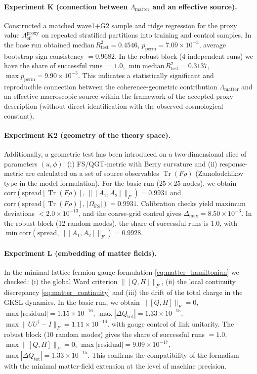 \documentclass[11pt,a4paper]{article}
\DeclareMathOperator{\Tr}{Tr}
\theoremstyle{definition}
\theoremstyle{plain}
\theoremstyle{remark}
\begin{document}
\paragraph{Experiment K (connection between $\Lambda_{\mathrm{matter}}$ and an effective source).}
Constructed a matched wave1+G2 sample and ridge regression for the proxy value
$\Lambda_{\mathrm{eff}}^{\mathrm{proxy}}$ on repeated stratified partitions into training and control samples.
In the base run obtained
$\mathrm{median}\,R^2_{\mathrm{test}}=0.4546$,
$p_{\mathrm{perm}}=7.09\times10^{-3}$,
average bootstrap sign consistency $=0.9682$.
In the robust block (4 independent runs) we have
the share of successful runs $=1.0$,
$\min\mathrm{median}\,R^2_{\mathrm{test}}=0.3137$,
$\max p_{\mathrm{perm}}=9.90\times10^{-3}$.
This indicates a statistically significant and reproducible connection between the
coherence-geometric contribution $\Lambda_{\mathrm{matter}}$ and an effective macroscopic source
within the framework of the accepted proxy description (without direct identification with the observed cosmological constant).

\paragraph{Experiment K2 (geometry of the theory space).}

Additionally, a geometric test has been introduced on a two-dimensional slice of parameters $(u,\phi)$:
(i) FS/QGT-metric with Berry curvature and (ii) response-metric are calculated on a set of source observables
$\Tr(F\rho)$ (Zamolodchikov type in the model formulation).
For the basic run ($25\times25$ nodes), we obtain
$\mathrm{corr}\!\left(\mathrm{spread}[\Tr(F\rho)],\,\|[A_1,A_2]\|_F\right)=0.9931$
and
$\mathrm{corr}\!\left(\mathrm{spread}[\Tr(F\rho)],\,|\Omega_{\mathrm{FS}}|\right)=0.9931$.
Calibration checks yield maximum deviations
$<2.0\times10^{-13}$, and the coarse-grid control gives
$\Delta_{\max}=8.50\times10^{-3}$.
In the robust block (12 random modes), the share of successful runs is $1.0$,
with
$\min\mathrm{corr}\!\left(\mathrm{spread},\|[A_1,A_2]\|_F\right)=0.9928$.

\paragraph{Experiment L (embedding of matter fields).}

In the minimal lattice fermion gauge formulation \eqref{eq:matter_hamiltonian}
we checked: (i) the global Ward criterion $\|[Q,H]\|_F$, (ii) the local continuity discrepancy \eqref{eq:matter_continuity}
and (iii) the drift of the total charge in the GKSL dynamics.
In the basic run, we obtain
$\|[Q,H]\|_F=0$,
$\max|\mathrm{residual}|=1.15\times10^{-16}$,
$\max|\Delta Q_{\mathrm{tot}}|=1.33\times10^{-15}$,
$\max\|UU^\dagger-I\|_F=1.11\times10^{-16}$.
with gauge control of link unitarity.
The robust block (10 random modes) gives
the share of successful runs $=1.0$,
$\max\|[Q,H]\|_F=0$,
$\max|\mathrm{residual}|=9.09\times10^{-17}$,
$\max|\Delta Q_{\mathrm{tot}}|=1.33\times10^{-15}$.
This confirms the compatibility of the formalism with the minimal matter-field extension at the level of machine precision.
\end{document}
